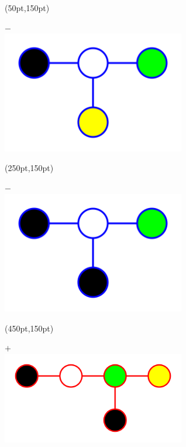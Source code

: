 \begin{tcolorbox}[title={\Large グラフの教師あり分類問題}]
	\begin{textblock*}{0.2\textwidth}(50pt,150pt)
		\begin{center}
			$\minus$ \\
			\includegraphics[width=0.6\textwidth]{img/graph/g05b.png}
		\end{center}
	\end{textblock*}

	\begin{textblock*}{0.2\textwidth}(250pt,150pt)
		\begin{center}
			$\minus$ \\
			\includegraphics[width=0.6\textwidth]{img/graph/g06b.png}
		\end{center}
	\end{textblock*}

	\begin{textblock*}{0.2\textwidth}(450pt,150pt)
		\begin{center}
			$\plus$ \\
			\includegraphics[width=0.6\textwidth]{img/graph/g07r.png}
		\end{center}
	\end{textblock*}


\end{tcolorbox}
